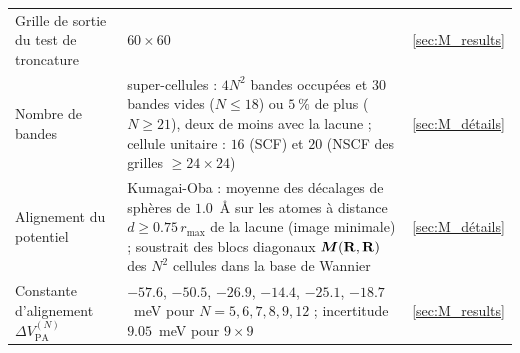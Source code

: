 \begin{table}[htbp]
\begin{tabular}{p{} p{} p{}}
        Grille de sortie du test de troncature & $60\times 60$ & \ref{sec:M_results} \\
        Nombre de bandes & super-cellules : $4N^2$ bandes occupées et $30$ bandes vides ($N\le 18$) ou $5~\%$ de plus ($N\ge 21$), deux de moins avec la lacune ; cellule unitaire : $16$ (SCF) et $20$ (NSCF des grilles $\ge 24\times 24$) & \ref{sec:M_détails} \\
        Alignement du potentiel & Kumagai-Oba : moyenne des décalages de sphères de $1.0$~\AA{} sur les atomes à distance $d \ge 0.75\,r_\text{max}$ de la lacune (image minimale) ; soustrait des blocs diagonaux $\bm M(\mathbf{R},\mathbf{R})$ des $N^2$ cellules dans la base de Wannier & \ref{sec:M_détails} \\
        Constante d'alignement $\Delta V_\text{PA}^{(N)}$ & $-57.6$, $-50.5$, $-26.9$, $-14.4$, $-25.1$, $-18.7$~meV pour $N = 5, 6, 7, 8, 9, 12$ ; incertitude $9.05$~meV pour $9\times 9$ & \ref{sec:M_results} \\
        \hline\hline
    \end{tabular}
\end{table}
\vspace*{\fill}
